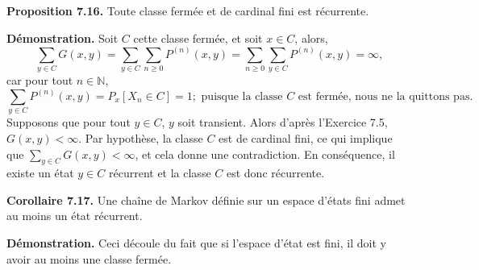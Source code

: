 \textbf{Proposition 7.16.} Toute classe fermée et de cardinal fini est récurrente.

\textbf{Démonstration.} Soit \(C\) cette classe fermée, et soit \(x \in C\), alors,
\[
\sum_{y \in C} G(x, y) = \sum_{y \in C} \sum_{n \geq 0} P^{(n)}(x, y) = \sum_{n \geq 0} \sum_{y \in C} P^{(n)}(x, y) = \infty,
\]
car pour tout \(n \in \mathbb{N}\),
\[
\sum_{y \in C} P^{(n)}(x, y) = P_x[X_n \in C] = 1 ; \text{ puisque la classe } C \text{ est fermée, nous ne la quittons pas.}
\]
Supposons que pour tout \(y \in C\), \(y\) soit transient. Alors d’après l’Exercice 7.5, \(G(x, y) < \infty\). Par hypothèse, la classe \(C\) est de cardinal fini, ce qui implique que \(\sum_{y \in C} G(x, y) < \infty\), et cela donne une contradiction. En conséquence, il existe un état \(y \in C\) récurrent et la classe \(C\) est donc récurrente.

\textbf{Corollaire 7.17.} Une chaîne de Markov définie sur un espace d’états fini admet au moins un état récurrent.

\textbf{Démonstration.} Ceci découle du fait que si l’espace d’état est fini, il doit y avoir au moins une classe fermée.
